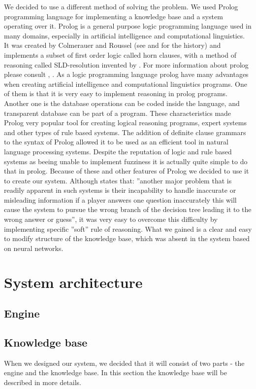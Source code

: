 \documentclass[a4paper]{article}
\begin{document}
We decided to use a different method of solving the problem. We used Prolog programming language for implementing a knowledge base and a system operating over it. Prolog is a general purpose logic programming language used in many domains, especially in artificial intelligence and computational linguistics. It was created by Colmerauer and Roussel (see \citet{Prolog} and \citet{LogicProgramming} for the history) and implements a subset of first order logic called horn clauses, with a method of reasoning called SLD-resolution invented by \citet{SLD}. For more information about prolog please consult \citet{ProgrammingInProlog}, \citet{PrologAI}. As a logic programming language prolog have many advantages when creating artificial intelligence and computational linguistics programs. One of them is that it is very easy to implement reasoning in prolog programs. Another one is the database operations can be coded inside the language, and transparent database can be part of a program. These characteristics made Prolog very popular tool for creating logical reasoning programs, expert systems and other types of rule based systems. The addition of definite clause grammars to the syntax of Prolog allowed it to be used as an efficient tool in natural language processing systems. Despite the reputation of logic and rule based systems as beeing unable to implement fuzziness it is actually quite simple to do that in prolog. Because of these and other features of Prolog we decided to use it to create our system. Although \citet{20Q} states that: ''another major problem that is readily apparent in such systems is their incapability to handle inaccurate or misleading information if a player answers one question inaccurately this will cause the system to pursue the wrong branch of the decision tree leading it to the wrong answer or guess'', it was very easy to overcome this difficulty by implementing specific ''soft'' rule of reasoning. What we gained is a clear and easy to modify structure of the knowledge base, which was absent in the system based on neural networks.
\section{System architecture}
\subsection{Engine}




\subsection{Knowledge base}
When we designed our system, we decided that it will consist of two parts - the engine and the knowledge base. In this section the knowledge base will be described in more details.
\end{document}
